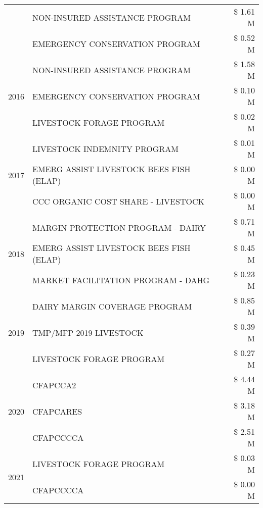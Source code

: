 \begin{tabular}{llr}
 & NON-INSURED ASSISTANCE PROGRAM & \$ 1.61 M \\
 & EMERGENCY CONSERVATION PROGRAM & \$ 0.52 M \\
\cline{1-3}
\multirow[t]{3}{*}{2016} & NON-INSURED ASSISTANCE PROGRAM                & \$ 1.58 M \\
 & EMERGENCY CONSERVATION PROGRAM                & \$ 0.10 M \\
 & LIVESTOCK FORAGE PROGRAM                      & \$ 0.02 M \\
\cline{1-3}
\multirow[t]{3}{*}{2017} & LIVESTOCK INDEMNITY PROGRAM & \$ 0.01 M \\
 & EMERG ASSIST LIVESTOCK BEES FISH (ELAP) & \$ 0.00 M \\
 & CCC ORGANIC COST SHARE - LIVESTOCK & \$ 0.00 M \\
\cline{1-3}
\multirow[t]{3}{*}{2018} & MARGIN PROTECTION PROGRAM - DAIRY & \$ 0.71 M \\
 & EMERG ASSIST LIVESTOCK BEES FISH (ELAP) & \$ 0.45 M \\
 & MARKET FACILITATION PROGRAM - DAHG & \$ 0.23 M \\
\cline{1-3}
\multirow[t]{3}{*}{2019} & DAIRY MARGIN COVERAGE PROGRAM & \$ 0.85 M \\
 & TMP/MFP 2019 LIVESTOCK & \$ 0.39 M \\
 & LIVESTOCK FORAGE PROGRAM & \$ 0.27 M \\
\cline{1-3}
\multirow[t]{3}{*}{2020} & CFAPCCA2 & \$ 4.44 M \\
 & CFAPCARES & \$ 3.18 M \\
 & CFAPCCCCA & \$ 2.51 M \\
\cline{1-3}
\multirow[t]{2}{*}{2021} & LIVESTOCK FORAGE PROGRAM & \$ 0.03 M \\
 & CFAPCCCCA & \$ 0.00 M \\
\cline{1-3}
\bottomrule
\end{tabular}
